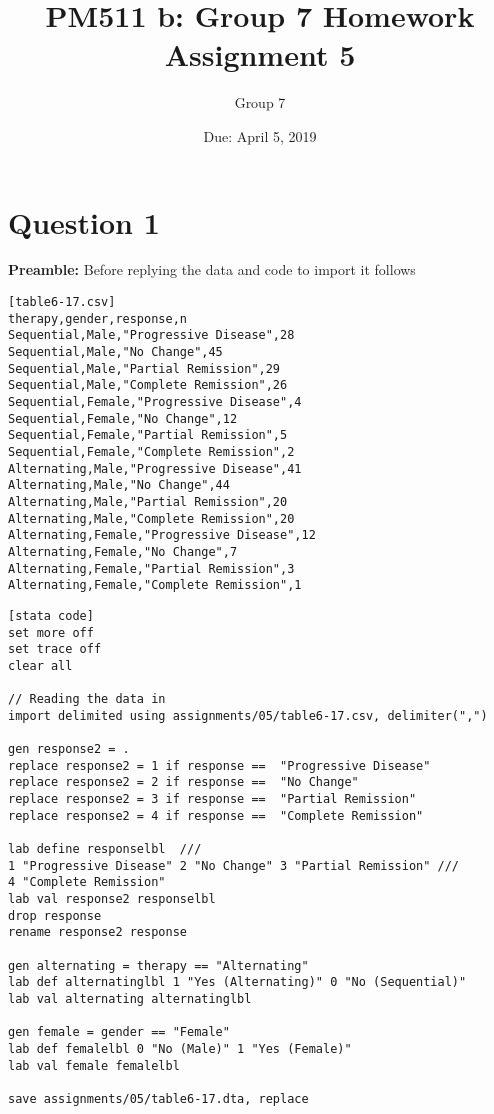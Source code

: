 \documentclass{article}
\title{PM511 b: Group 7 Homework Assignment 5}
\author{Group 7}
\date{Due: April 5, 2019}
\begin{document}
\selectfont

\maketitle

\section{Question 1}

\textbf{Preamble:} Before replying the data and code to import it follows



\begin{verbatim}[table6-17.csv]
therapy,gender,response,n
Sequential,Male,"Progressive Disease",28
Sequential,Male,"No Change",45
Sequential,Male,"Partial Remission",29
Sequential,Male,"Complete Remission",26
Sequential,Female,"Progressive Disease",4
Sequential,Female,"No Change",12
Sequential,Female,"Partial Remission",5
Sequential,Female,"Complete Remission",2
Alternating,Male,"Progressive Disease",41
Alternating,Male,"No Change",44
Alternating,Male,"Partial Remission",20
Alternating,Male,"Complete Remission",20
Alternating,Female,"Progressive Disease",12
Alternating,Female,"No Change",7
Alternating,Female,"Partial Remission",3
Alternating,Female,"Complete Remission",1
\end{verbatim}

\begin{verbatim}[stata code]
set more off
set trace off
clear all

// Reading the data in
import delimited using assignments/05/table6-17.csv, delimiter(",")

gen response2 = .
replace response2 = 1 if response ==  "Progressive Disease"
replace response2 = 2 if response ==  "No Change"
replace response2 = 3 if response ==  "Partial Remission"
replace response2 = 4 if response ==  "Complete Remission"

lab define responselbl  ///
1 "Progressive Disease" 2 "No Change" 3 "Partial Remission" ///
4 "Complete Remission"
lab val response2 responselbl
drop response
rename response2 response

gen alternating = therapy == "Alternating"
lab def alternatinglbl 1 "Yes (Alternating)" 0 "No (Sequential)"
lab val alternating alternatinglbl

gen female = gender == "Female"
lab def femalelbl 0 "No (Male)" 1 "Yes (Female)"
lab val female femalelbl

save assignments/05/table6-17.dta, replace
\end{verbatim}
\end{document}
